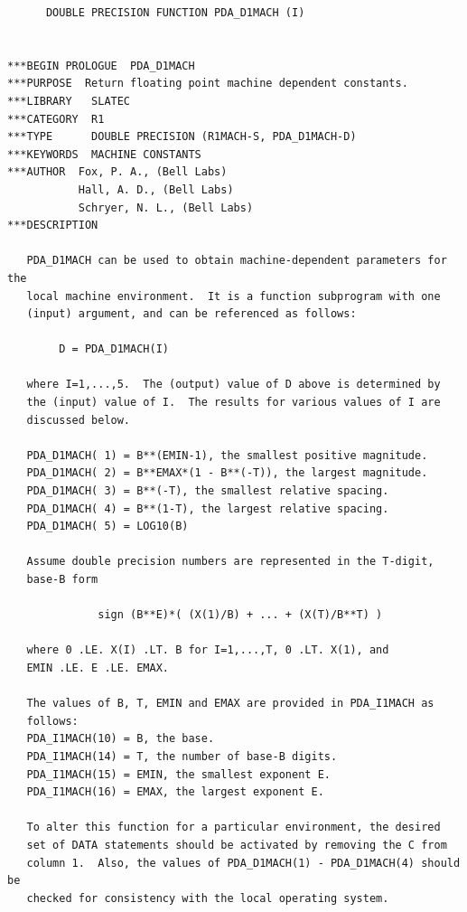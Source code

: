 \documentclass[11pt,twoside]{article}
\begin{document}
\begin{verbatim}
      DOUBLE PRECISION FUNCTION PDA_D1MACH (I)


***BEGIN PROLOGUE  PDA_D1MACH
***PURPOSE  Return floating point machine dependent constants.
***LIBRARY   SLATEC
***CATEGORY  R1
***TYPE      DOUBLE PRECISION (R1MACH-S, PDA_D1MACH-D)
***KEYWORDS  MACHINE CONSTANTS
***AUTHOR  Fox, P. A., (Bell Labs)
           Hall, A. D., (Bell Labs)
           Schryer, N. L., (Bell Labs)
***DESCRIPTION

   PDA_D1MACH can be used to obtain machine-dependent parameters for the
   local machine environment.  It is a function subprogram with one
   (input) argument, and can be referenced as follows:

        D = PDA_D1MACH(I)

   where I=1,...,5.  The (output) value of D above is determined by
   the (input) value of I.  The results for various values of I are
   discussed below.

   PDA_D1MACH( 1) = B**(EMIN-1), the smallest positive magnitude.
   PDA_D1MACH( 2) = B**EMAX*(1 - B**(-T)), the largest magnitude.
   PDA_D1MACH( 3) = B**(-T), the smallest relative spacing.
   PDA_D1MACH( 4) = B**(1-T), the largest relative spacing.
   PDA_D1MACH( 5) = LOG10(B)

   Assume double precision numbers are represented in the T-digit,
   base-B form

              sign (B**E)*( (X(1)/B) + ... + (X(T)/B**T) )

   where 0 .LE. X(I) .LT. B for I=1,...,T, 0 .LT. X(1), and
   EMIN .LE. E .LE. EMAX.

   The values of B, T, EMIN and EMAX are provided in PDA_I1MACH as
   follows:
   PDA_I1MACH(10) = B, the base.
   PDA_I1MACH(14) = T, the number of base-B digits.
   PDA_I1MACH(15) = EMIN, the smallest exponent E.
   PDA_I1MACH(16) = EMAX, the largest exponent E.

   To alter this function for a particular environment, the desired
   set of DATA statements should be activated by removing the C from
   column 1.  Also, the values of PDA_D1MACH(1) - PDA_D1MACH(4) should be
   checked for consistency with the local operating system.


\end{verbatim}
\end{document}
